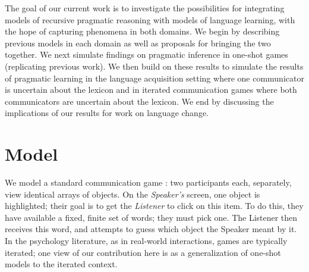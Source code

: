 \documentclass{article} %
\begin{document}

The goal of our current work is to investigate the possibilities for
integrating models of recursive pragmatic reasoning with models of
language learning, with the hope of capturing phenomena in both
domains. We begin by describing previous models in each domain as well
as proposals for bringing the two together. We next simulate findings
on pragmatic inference in one-shot games (replicating previous
work). We then build on these results to simulate the results of pragmatic
learning in the language acquisition setting where one communicator is
uncertain about the lexicon and in iterated communication games where both
communicators are uncertain about the lexicon. We end by discussing the implications of our results for
work on language change.






% 


\section{Model}

We model a standard communication game \cite{krauss1964,clark1986}:
two participants each, separately, view identical arrays of
objects. On the \textit{Speaker's} screen, one object is highlighted;
their goal is to get the \textit{Listener} to click on this item. To
do this, they have available a fixed, finite set of words; they must
pick one. The Listener then receives this word, and attempts to guess
which object the Speaker meant by it. In the psychology literature, as
in real-world interactions, games are typically iterated; one view of
our contribution here is as a generalization of one-shot models
\cite{frank2012,bergen2012} to the iterated context.
\end{document}
